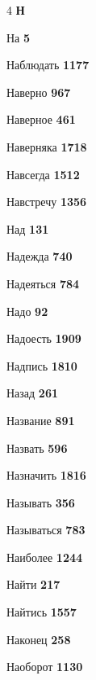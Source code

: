 \begin{multicols}{4}
\vspace{0.6em}\noindent\textbf{\normalsize\sffamily\color{primary} Н}\par\vspace{0.2em}
\noindent На \dotfill \textbf{\color{secondary} 5}\par
\noindent Наблюдать \dotfill \textbf{\color{secondary} 1177}\par
\noindent Наверно \dotfill \textbf{\color{secondary} 967}\par
\noindent Наверное \dotfill \textbf{\color{secondary} 461}\par
\noindent Наверняка \dotfill \textbf{\color{secondary} 1718}\par
\noindent Навсегда \dotfill \textbf{\color{secondary} 1512}\par
\noindent Навстречу \dotfill \textbf{\color{secondary} 1356}\par
\noindent Над \dotfill \textbf{\color{secondary} 131}\par
\noindent Надежда \dotfill \textbf{\color{secondary} 740}\par
\noindent Надеяться \dotfill \textbf{\color{secondary} 784}\par
\noindent Надо \dotfill \textbf{\color{secondary} 92}\par
\noindent Надоесть \dotfill \textbf{\color{secondary} 1909}\par
\noindent Надпись \dotfill \textbf{\color{secondary} 1810}\par
\noindent Назад \dotfill \textbf{\color{secondary} 261}\par
\noindent Название \dotfill \textbf{\color{secondary} 891}\par
\noindent Назвать \dotfill \textbf{\color{secondary} 596}\par
\noindent Назначить \dotfill \textbf{\color{secondary} 1816}\par
\noindent Называть \dotfill \textbf{\color{secondary} 356}\par
\noindent Называться \dotfill \textbf{\color{secondary} 783}\par
\noindent Наиболее \dotfill \textbf{\color{secondary} 1244}\par
\noindent Найти \dotfill \textbf{\color{secondary} 217}\par
\noindent Найтись \dotfill \textbf{\color{secondary} 1557}\par
\noindent Наконец \dotfill \textbf{\color{secondary} 258}\par
\noindent Наоборот \dotfill \textbf{\color{secondary} 1130}\par

\end{multicols}
